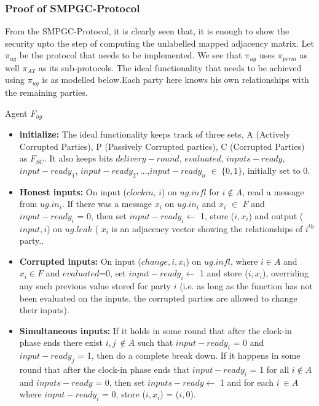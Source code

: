 \documentclass{llncs}
\begin{document}
\subsubsection{Proof of SMPGC-Protocol}
From the SMPGC-Protocol, it is clearly seen that, it is enough to show the security upto the step of computing the unlabelled mapped adjacency matrix. Let $\pi_{ug}$ be the protocol that needs to be implemented. We see that $\pi_{ug}$ uses $\pi_{perm}$ as well $\pi_{AT}$ as its sub-protocols. The ideal functionality that needs to be achieved using $\pi_{ug}$ is as modelled below.Each party here knows his own relationships with the remaining parties.\\
\begin{framed}
\begin{center}
Agent $F_{ug}$
\end{center} 
\begin{itemize}

\item \textbf{initialize:} The ideal functionality keeps track of three sets, A 
(Actively Corrupted Parties), P (Passively Corrupted parties), C (Corrupted 
Parties) as $F_{SC}$. It also keeps bits $delivery-round$, $evaluated$, $inputs-ready$, $input-ready_1$, $input-ready_2,\dots$,$input-ready_n$ $ \in\ \{0,1\}$, 
initially set to 0.

\item \textbf{Honest inputs:} On input ($clockin$, $i$) on $ug.infl$ for $i \notin A$, read a message from $ug.in_i$. If there was a message $x_i$ on $ug.in_i$ and $x_i$ $\in$ $F$ and $input-ready_i$ = 0, then set $input-ready_i\leftarrow$  1, store ($i, x_i$) and output ($input, i$) on $ug.leak$ ( $x_i$ is an adjacency vector showing the relationships of $i^{th}$ party..

\item \textbf{Corrupted inputs:} On input ($change, i, x_i$) on $ug.infl$, where $i \in A$ and $x_i \in F$ and $evaluated$=0, set $input-ready_i \leftarrow$ 1 and store ($i, x_i$), overriding any such previous value stored for party $i$ (i.e. as long as the function has not been evaluated on the inputs, the corrupted parties are allowed to change their inputs).

\item \textbf{Simultaneous inputs:}  If it holds in some round that after the clock-in phase ends there exist $i,j\ \notin A$ such that $input-ready_i$ = 0 and $input-ready_j$ = 1, then do a complete break down. If it happens in some round that after the clock-in phase ends that $input-ready_i$ = 1 for all $i \notin A$ and $inputs-ready$ = 0, then set $inputs-ready \leftarrow$ 1 and for each $i\ \in A$ where $input-ready_i$ = 0, store ($i,x_i$) = ($i,0$).


\end{itemize}
\end{framed}
\end{document}
